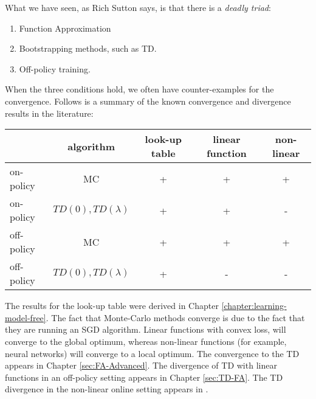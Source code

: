 What we have seen, as Rich Sutton says, is that there is a {\em deadly
triad}:
\begin{enumerate}
\item
Function Approximation
\item
Bootstrapping methods, such as TD.
\item
Off-policy training.
\end{enumerate}
When the three conditions hold, we often have counter-examples for the convergence.
Follows is a summary of the known convergence and divergence results in
the literature:
\begin{center}
  \begin{tabular}{ | l | c | c|c|c| }
    \hline
    & algorithm & look-up table&linear function&non-linear\\ \hline
    on-policy & MC & + & + & + \\ \hline
    on-policy & $TD(0),TD(\lambda)$ & + & + & -\\ \hline
    off-policy & MC & + & + & + \\ \hline
    off-policy & $TD(0),TD(\lambda)$ & + & - & -\\ \hline
  \end{tabular}
\end{center}

The results for the look-up table were derived in Chapter
\ref{chapter:learning-model-free}.
%
The fact that Monte-Carlo methods converge is due to the fact that
they are running an SGD algorithm. Linear functions with convex
loss, will converge to the global optimum, whereas non-linear
functions (for example, neural networks) will converge to a local optimum. 
The convergence to the TD appears in Chapter
\ref{sec:FA-Advanced}. The divergence of TD with linear functions in
an off-policy setting appears in Chapter \ref{sec:TD-FA}. The TD
divergence in the non-linear online setting appears in
\cite{TsitsiklisVR97}.



